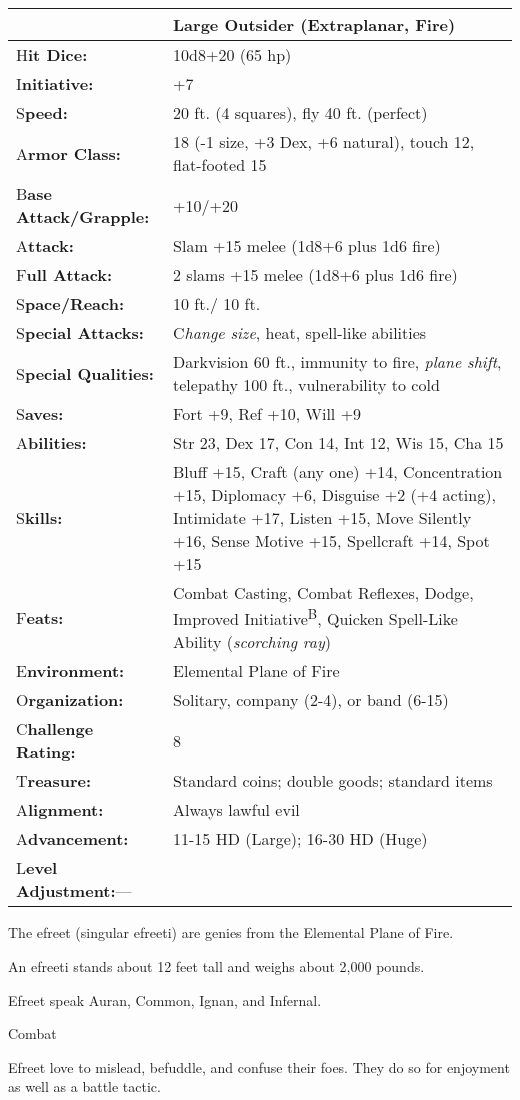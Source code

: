 \documentclass{article}
\begin{document}
\begin{tabular}{|>{\raggedright}p{89pt}|>{\raggedright}p{236pt}|}
\hline
  & Large Outsider (Extraplanar, Fire)\tabularnewline
\hline
H\textbf{it Dice:} & 10d8+20 (65 hp)\tabularnewline
\hline
I\textbf{nitiative:} & +7\tabularnewline
\hline
S\textbf{peed:} & 20 ft. (4 squares), fly 40 ft. (perfect)\tabularnewline
\hline
A\textbf{rmor Class:} & 18 (-1 size, +3 Dex, +6 natural), touch 12, flat-footed 
15\tabularnewline
\hline
B\textbf{ase Attack/Grapple:} & +10/+20\tabularnewline
\hline
A\textbf{ttack:} & Slam +15 melee (1d8+6 plus 1d6 fire)\tabularnewline
\hline
F\textbf{ull Attack:} & 2 slams +15 melee (1d8+6 plus 1d6 fire)\tabularnewline
\hline
S\textbf{pace/Reach:} & 10 ft./ 10 ft.\tabularnewline
\hline
S\textbf{pecial Attacks:} & C\textit{hange size}, heat, spell-like abilities\tabularnewline
\hline
S\textbf{pecial Qualities:} & Darkvision 60 ft., immunity to fire, \textit{plane 
shift}, telepathy 100 ft., vulnerability to cold \tabularnewline
\hline
S\textbf{aves:} & Fort +9, Ref +10, Will +9\tabularnewline
\hline
A\textbf{bilities:} & Str 23, Dex 17, Con 14, Int 12, Wis 15, Cha 15\tabularnewline
\hline
S\textbf{kills:} & Bluff +15, Craft (any one) +14, Concentration +15, Diplomacy 
+6, Disguise +2 (+4 acting), Intimidate +17, Listen +15, Move Silently +16, Sense 
Motive +15, Spellcraft +14, Spot +15\tabularnewline
\hline
F\textbf{eats:} & Combat Casting, Combat Reflexes, Dodge, Improved Initiative\textsuperscript{B}, 
Quicken Spell-Like Ability (\textit{scorching ray})\tabularnewline
\hline
E\textbf{nvironment:} & Elemental Plane of Fire\tabularnewline
\hline
O\textbf{rganization:} & Solitary, company (2-4), or band (6-15)\tabularnewline
\hline
C\textbf{hallenge Rating:} & 8\tabularnewline
\hline
T\textbf{reasure:} & Standard coins; double goods; standard items\tabularnewline
\hline
A\textbf{lignment:} & Always lawful evil\tabularnewline
\hline
A\textbf{dvancement:} & 11-15 HD (Large); 16-30 HD (Huge)\tabularnewline
\hline
L\textbf{evel Adjustment:}--- & \tabularnewline
\hline
\end{tabular}

The efreet (singular efreeti) are genies from the Elemental Plane of Fire. 

An efreeti stands about 12 feet tall and weighs about 2,000 pounds.

Efreet speak Auran, Common, Ignan, and Infernal.

Combat

Efreet love to mislead, befuddle, and confuse their foes. They do so for enjoyment 
as well as a battle tactic.
\end{document}
